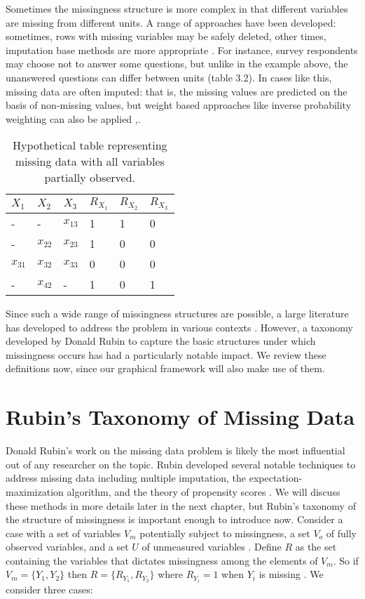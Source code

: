 \documentclass[12pt,twoside]{reedthesis}
\theoremstyle{definition}
\begin{document}
Sometimes the missingness structure is more complex in that different variables are missing from different units. A range of approaches have been developed: sometimes, rows with missing variables may be safely deleted, other times, imputation base methods are more appropriate \citep{Schafer_2002}.  For instance, survey respondents may choose not to answer some questions, but unlike in the example above, the unanswered questions can differ between units (table 3.2). In cases like this, missing data are often imputed: that is, the missing values are predicted on the basis of non-missing values, but weight based approaches like inverse probability weighting can also be applied \citep{Little_1986} ,\citep{Seaman_2011}. 

\begin{table}[]
\centering
\begin{tabular}{|l|l|l|l|l|l}
$X_1$    & $X_2$    & $X_3$    & $R_{X_1}$ & $R_{X_2}$ & $R_{X_3}$ \\ \hline
-        & -        & $x_{13}$ & 1         & 1         & 0         \\
-        & $x_{22}$ & $x_{23}$ & 1         & 0         & 0         \\
$x_{31}$ & $x_{32}$ & $x_{33}$ & 0         & 0         & 0         \\
-        & $x_{42}$ & -        & 1         & 0         & 1        
\end{tabular}
\caption{Hypothetical table representing missing data with all variables partially observed.}
\end{table}

Since such a wide range of missingness structures are possible, a large  literature has developed to address the problem in various contexts \citep{Schafer_2002}.  However, a taxonomy developed  by Donald Rubin to capture the basic structures under which missingness occurs has had a particularly notable impact. We review these definitions now, since our graphical framework will also make use of them. 

\section{Rubin's Taxonomy of Missing Data}

Donald Rubin's work on the missing data problem is likely the most influential out of any researcher on the topic. Rubin developed several notable techniques to address missing data including multiple imputation, the expectation-maximization algorithm, and the theory of propensity scores \citep{Little_1986}. We will discuss these methods in more details later in the next chapter, but Rubin's taxonomy \citep{Rubin_1976} of the structure of missingness is important enough to introduce now. Consider a  case with a set of variables $V_m$ potentially subject to missingness, a set $V_o$ of  fully observed variables, and a set $U$ of unmeasured variables \citep{Mohan_2013}. Define $R$ as the set containing the variables that dictates missingness among the elements of $V_m$. So if $V_m = \{Y_1, Y_2\}$ then $R = \{R_{Y_1}, R_{Y_2}\}$ where $R_{Y_i} = 1$ when $Y_i$ is missing \citep{Mohan_2013}. We consider three cases:
\end{document}
